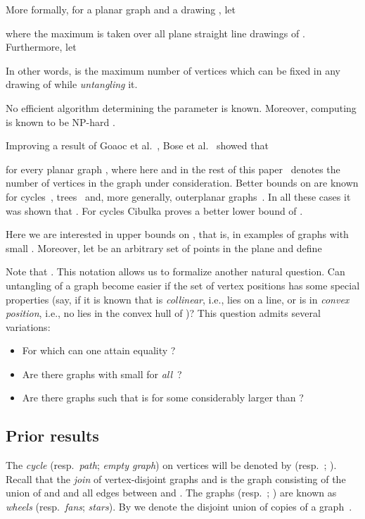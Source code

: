 \documentclass[reqno,12pt]{amsart}
\begin{document}
More formally, for a planar graph  and a drawing , let

where the maximum is taken over all plane straight line drawings  of .
Furthermore, let

In other words,  is the maximum number of vertices
which can be fixed in any drawing of  while \emph{untangling} it.

No efficient algorithm determining the parameter  is known.
Moreover, computing  is known to be NP-hard \cite{merged,Ver}.

Improving a result of Goaoc et al.~\cite{merged},
Bose et al.~\cite{Bose} showed that

for every planar graph , where here and in the rest of this paper~ 
denotes the number of vertices
in the graph under consideration. Better bounds on  are known
for cycles~\cite{PTa}, trees~\cite{merged,Bose} and, more generally, outerplanar 
graphs~\cite{merged,RVe}. In all these cases it was shown that .
For cycles Cibulka \cite{Cib} proves a better lower bound of .

Here we are interested in upper bounds on , that is, in examples of graphs
with small . Moreover, let  be an arbitrary set of  points in the 
plane and define

Note that .
This notation allows us to formalize another natural question.
Can untangling of a graph become easier if the set  of vertex positions
has some special properties (say, if it is known that  is \emph{collinear}, i.e.,
lies on a line, or is in \emph{convex position}, i.e., 
no  lies in the convex hull of )? 
This question admits several variations:
\begin{itemize}
\item
For which  can one attain equality ?
\item
Are there graphs with  small for \emph{all}~?
\item
Are there graphs such that  is for some  considerably
larger than ?
\end{itemize}

\subsection{Prior results}\label{ss:prior}
The \emph{cycle} (resp.\ \emph{path}; \emph{empty graph})
on  vertices will be denoted by  (resp.\ ; ).
Recall that the \emph{join} of vertex-disjoint graphs  and 
is the graph  consisting of the union of  and  and all
edges between  and . The graphs  (resp.\
; ) are known as \emph{wheels} (resp.\
\emph{fans}; \emph{stars}). By  we denote
the disjoint union of  copies of a graph~.
\end{document}
